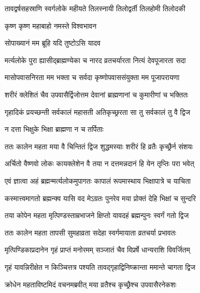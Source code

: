 \twolineshloka
{तावद्वर्षसहस्राणि स्वर्गलोके महीयते}
{तिलस्नायी तिलोद्वर्ती तिलहोमी तिलोदकी}%



\onelineshloka
{कृष्ण कृष्ण महाबाहो नमस्ते विश्वभावन}%

{सोपाख्यानं मम ब्रूहि यदि तुष्टोऽसि यादव}



\twolineshloka
{मर्त्यलोके पुरा ह्यासीद्ब्राह्मण्येका च नारद}
{व्रतचर्यारता नित्यं देवपूजारता सदा}%

\twolineshloka
{मासोपवासनिरता मम भक्ता च सर्वदा}
{कृष्णोपवाससंयुक्ता मम पूजापरायणा}%

\twolineshloka
{शरीरं क्लेशितं चैव उपवासैर्द्विजोत्तम}
{देवानां ब्राह्मणानां च कुमारीणां च भक्तितः}%

\twolineshloka
{गृहादिकं प्रयच्छन्ती सर्वकालं महासती}
{अतिकृच्छ्ररता सा तु सर्वकालं तु वै द्विज}%

\onelineshloka
{न दत्ता भिक्षुके भिक्षा ब्राह्मणा न च तर्पिताः}%

\twolineshloka
{ततः कालेन महता मया वै चिन्तितं द्विज}
{शुद्धमस्याः शरीरं हि व्रतैः कृच्छ्रैर्न संशयः}%

\twolineshloka
{अर्चितो वैष्णवो लोकः कायक्लेशेन  वै तया}
{न दत्तमन्नदानं हि येन तृप्तिः परा भवेत्}%

\twolineshloka
{एवं ज्ञात्वा अहं ब्रह्मन्मर्त्यलोकमुपागतः}
{कापालं रूपमास्थाय भिक्षापात्रे च याचिता}%

\twolineshloka
{कस्मात्त्वमागतो ब्रह्मन्क्व यासि वद मेऽग्रतः}
{पुनरेव मया प्रोक्तं देहि भिक्षां च सुन्दरि}%

\twolineshloka
{तया कोपेन महता मृत्पिण्डस्ताम्रभाजने}
{क्षिप्तो यावदहं ब्रह्मन्पुनः स्वर्गं गतो द्विज}%

\twolineshloka
{ततः कालेन महता तापसी सुमहाव्रता}
{सदेहा स्वर्गमायाता व्रतचर्या प्रभावतः}%

\twolineshloka
{मृत्पिण्डिकाप्रदानेन गृहं प्राप्तं मनोरमम्}
{सञ्जातं चैव विप्रर्षे धान्यराशि विवर्जितम्}%

\twolineshloka
{गृहं यावन्निरीक्षेत न किञ्चित्तत्र पश्यति}
{तावद्गृहाद्विनिष्क्रान्ता ममान्ते चागता द्विज}%

\twolineshloka
{क्रोधेन महताविष्टमिदं वचनमब्रवीत्}
{मया व्रतैश्च कृच्छ्रैश्च उपवासैरनेकशः}%

